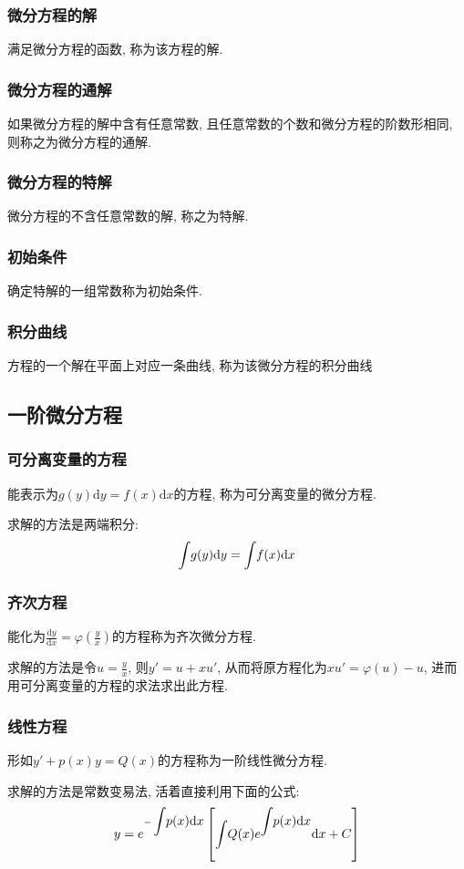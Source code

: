 \subsubsection{微分方程的解}
满足微分方程的函数, 称为该方程的解.
\subsubsection{微分方程的通解}
如果微分方程的解中含有任意常数, 且任意常数的个数和微分方程的阶数形相同, 则称之为微分方程的通解.
\subsubsection{微分方程的特解}
微分方程的不含任意常数的解, 称之为特解.
\subsubsection{初始条件}
确定特解的一组常数称为初始条件.
\subsubsection{积分曲线}
方程的一个解在平面上对应一条曲线, 称为该微分方程的积分曲线
\subsection{一阶微分方程}
\subsubsection{可分离变量的方程}
能表示为$ g(y)\mathrm{d}y=f(x)\mathrm{d}x $的方程, 称为可分离变量的微分方程. \par
求解的方法是两端积分:
\begin{equation*}
\displaystyle\int_{}\hspace{.2em} g(y)\mathrm{d}y=\displaystyle\int_{}\hspace{.2em}f(x)\mathrm{d}x
\end{equation*}
\subsubsection{齐次方程}
能化为$ \frac{\mathrm{d}y}{\mathrm{d}x}=\varphi(\frac{y}{x}) $的方程称为齐次微分方程.\par
求解的方法是令$ u=\frac{y}{x} $, 则$ y'=u+xu' $, 从而将原方程化为$ xu'=\varphi(u)-u $, 进而用可分离变量的方程的求法求出此方程.
\subsubsection{线性方程}
形如$ y'+p(x)y=Q(x) $的方程称为一阶线性微分方程. \par
求解的方法是常数变易法, 活着直接利用下面的公式:
\begin{equation*}
y=e^{-\displaystyle\int_{}\hspace{.2em}p(x)\mathrm{d}x}\left[\displaystyle\int_{}\hspace{.2em}Q(x)e^{\displaystyle\int_{}\hspace{.2em}p(x)\mathrm{d}x}\mathrm{d}x+C\right]
\end{equation*}

